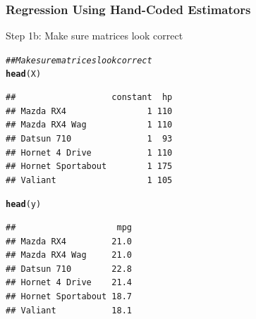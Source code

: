 \documentclass{beamer}\usepackage[]{graphicx}\usepackage[]{xcolor}
\makeatletter
\newcommand{\hlcom}[1]{\textcolor[rgb]{0.678,0.584,0.686}{\textit{#1}}}%
\newcommand{\hlopt}[1]{\textcolor[rgb]{0,0,0}{#1}}%
\newcommand{\hlstd}[1]{\textcolor[rgb]{0.345,0.345,0.345}{#1}}%
\newcommand{\hlkwb}[1]{\textcolor[rgb]{0.69,0.353,0.396}{#1}}%
\newcommand{\hlkwd}[1]{\textcolor[rgb]{0.737,0.353,0.396}{\textbf{#1}}}%
\newenvironment{kframe}{%
 \def\at@end@of@kframe{}%
 \ifinner\ifhmode%
  \def\at@end@of@kframe{\end{minipage}}%
  \begin{minipage}{\columnwidth}%
 \fi\fi%
 \def\FrameCommand##1{\hskip\@totalleftmargin \hskip-\fboxsep
 \colorbox{shadecolor}{##1}\hskip-\fboxsep
     \hskip-\linewidth \hskip-\@totalleftmargin \hskip\columnwidth}%
 \MakeFramed {\advance\hsize-\width
   \@totalleftmargin\z@ \linewidth\hsize
   \@setminipage}}%
 {\par\unskip\endMakeFramed%
 \at@end@of@kframe}
\newenvironment{knitrout}{}{} %
\makeatother
\begin{document}
\begin{frame}[fragile]\frametitle{Regression Using Hand-Coded Estimators}
    Step 1b: Make sure matrices look correct
\begin{knitrout}\footnotesize
{}\color{fgcolor}\begin{kframe}
\begin{alltt}
\hlcom{## Make sure matrices look correct}
\hlkwd{head}\hlstd{(X)}
\end{alltt}
\begin{verbatim}
##                   constant  hp
## Mazda RX4                1 110
## Mazda RX4 Wag            1 110
## Datsun 710               1  93
## Hornet 4 Drive           1 110
## Hornet Sportabout        1 175
## Valiant                  1 105
\end{verbatim}
\begin{alltt}
\hlkwd{head}\hlstd{(y)}
\end{alltt}
\begin{verbatim}
##                    mpg
## Mazda RX4         21.0
## Mazda RX4 Wag     21.0
## Datsun 710        22.8
## Hornet 4 Drive    21.4
## Hornet Sportabout 18.7
## Valiant           18.1
\end{verbatim}
\end{kframe}
\end{knitrout}
\end{frame}

\end{document}
